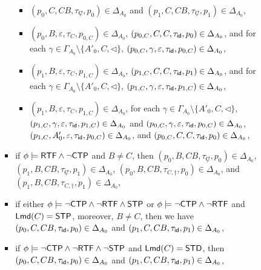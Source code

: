 \begin{itemize}
\begin{itemize}
\begin{itemize}
\begin{itemize}
				\begin{itemize}
					\item $(p_0, C, CB, \tau_{\not C}, p_0) \in \Delta_{A_0}$ and $(p_1, C, CB, \tau_{\not C}, p_1) \in \Delta_{A_0}$, 
%
					\item $(p_0, B, \varepsilon, \tau_{C}, p_{0,C}) \in \Delta_{A_0}$, $(p_{0,C}, C, C, \tau_{\mathsf{id}}, p_0)  \in \Delta_{A_0}$, and for each $\gamma \in \Gamma_{A_0} \setminus \{A'_0, C, \triangleleft\}$, $(p_{0,C}, \gamma, \varepsilon, \tau_{\mathsf{id}}, p_{0,C}) \in \Delta_{A_0}$, 
%					
					\item $(p_1, B, \varepsilon, \tau_{C}, p_{1, C}) \in \Delta_{A_0}$, $(p_{1, C}, C, C, \tau_{\mathsf{id}}, p_1)  \in \Delta_{A_0}$, and for each $\gamma \in \Gamma_{A_0} \setminus \{A'_0, C, \triangleleft\}$, $(p_{1,C}, \gamma, \varepsilon, \tau_{\mathsf{id}}, p_{1,C}) \in \Delta_{A_0}$, 
%
					\item $(p_1, B, \varepsilon, \tau_{C}, p_{1, C}) \in \Delta_{A_0}$, for each $\gamma \in \Gamma_{A_0} \setminus \{A'_0, C, \triangleleft\}$, $(p_{1,C}, \gamma, \varepsilon, \tau_{\mathsf{id}}, p_{1,C}) \in \Delta_{A_0}$ and $(p_{0,C}, \gamma, \varepsilon, \tau_{\mathsf{id}}, p_{0,C}) \in \Delta_{A_0}$, 
					$(p_{1,C}, A'_0, \varepsilon, \tau_{\mathsf{id}}, p_{0,C}) \in \Delta_{A_0}$, and $(p_{0, C}, C, C, \tau_{\mathsf{id}}, p_0)  \in \Delta_{A_0}$, 
				\end{itemize}
%
				\item if $\phi \models {\sf RTF} \wedge \neg{\sf CTP}$ and $B\neq C$,  
                then $(p_0, B, CB, \tau_{\not C}, p_0) \in \Delta_{A_0}$, $(p_1, B, CB, \tau_{\not C}, p_1) \in \Delta_{A_0}$,  $(p_0, B, CB, \tau_{C, \dag}, p_0) \in \Delta_{A_0}$, 
                and $(p_1, B, CB, \tau_{C, \dag}, p_1) \in \Delta_{A_0}$,
%
				\item if either $\phi \models \neg{\sf CTP} \wedge \neg {\sf RTF} \wedge {\sf STP}$ or $\phi \models \neg{\sf CTP} \wedge \neg {\sf RTF}$ and ${\sf Lmd}(C) = {\sf STP}$, moreover, $B \neq C$, then we have $(p_0, C, CB, \tau_{\mathsf{id}}, p_0) \in \Delta_{A_0}$ and $(p_1, C, CB, \tau_{\mathsf{id}}, p_1) \in \Delta_{A_0}$, 
				\item if $\phi \models \neg{\sf CTP} \wedge \neg {\sf RTF} \wedge \neg {\sf STP}$ and ${\sf Lmd}(C) = {\sf STD}$, then $(p_0, C, CB, \tau_{\mathsf{id}}, p_0) \in \Delta_{A_0}$ and $(p_1, C, CB, \tau_{\mathsf{id}}, p_1) \in \Delta_{A_0}$,
				\end{itemize}
				

\end{itemize}
\end{itemize}
\end{itemize}
